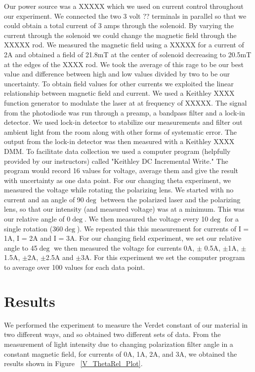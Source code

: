 \documentclass[prb,preprint]{revtex4-1}
\begin{document}
Our power source was a XXXXX which we used on current control throughout our experiment. We connected the two 3 volt ??  terminals in parallel so that we could obtain a total current of 3 amps through the solenoid. By varying the current through the solenoid we could change the magnetic field through the XXXXX rod. We measured the magnetic field using a XXXXX for a current of 2A and obtained a field of 21.8mT at the center of solenoid decreasing to 20.5mT at the edges of the XXXX rod. We took the average of this rage to be our best value and difference between high and low values divided by two to be our uncertainty. To obtain field values for other currents we exploited the linear relationship between magnetic field and current.
We used a Keithley XXXX function generator to modulate the laser at at frequency of XXXXX. The signal from the photodiode was run through a preamp, a bandpass filter and a lock-in detector. We used lock-in detector to stabilize our measurements and filter out ambient light from the room along with other forms of systematic error.
The output from the lock-in detector was then measured with a Keithley XXXX DMM. To facilitate data collection we used a computer program (helpfully provided by our instructors) called "Keithley DC Incremental Write." The program would record 16 values for voltage, average them and give the result with uncertainty as one data point. 
For our changing theta experiment, we measured the voltage while rotating the polarizing lens. We started with no current and an angle of 90$\deg$ between the polarized laser and the polarizing lens, so that our intensity (and measured voltage) was at a minimum. This was our relative angle of 0$\deg$. We then measured the voltage every 10$\deg$ for a single rotation (360$\deg$). We repeated this this measurement for currents of I = 1A, I = 2A and I = 3A.
For our changing field experiment, we set our relative angle to 45$\deg$ we then measured the voltage for currents 0A, $\pm$ 0.5A, $\pm$1A, $\pm$1.5A, $\pm$2A, $\pm$2.5A and $\pm$3A. For this experiment we set the computer program to average over 100 values for each data point.

\section{Results}

We performed the experiment to measure the Verdet constant of our material in two different ways, and so obtained two different sets of data.  From the measurement of light intensity due to changing polarization filter angle in a constant magnetic field, for currents of 0A, 1A, 2A, and 3A, we obtained the results shown in Figure ~\ref{V_ThetaRel_Plot}. 
\end{document}
